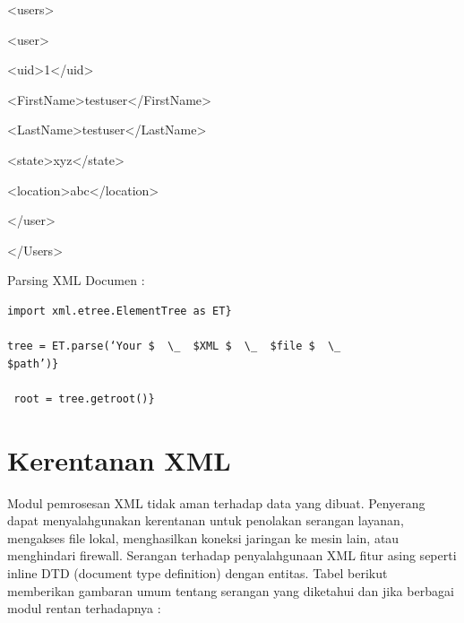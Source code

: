  {\fontsize{10pt}{10pt}\selectfont <users>} 
 
{\fontsize{10pt}{10pt}\selectfont  \hspace*{0.5in} <user>} 
 
{\fontsize{10pt}{10pt}\selectfont  \hspace*{0.5in}  \hspace*{0.5in} <uid>1</uid>} 
 
{\fontsize{10pt}{10pt}\selectfont  \hspace*{0.5in}  \hspace*{0.5in} <FirstName>testuser</FirstName>} 
 
{\fontsize{10pt}{10pt}\selectfont  \hspace*{0.5in}  \hspace*{0.5in} <LastName>testuser</LastName>} 
 
{\fontsize{10pt}{10pt}\selectfont  \hspace*{0.5in}  \hspace*{0.5in} <state>xyz</state>} 
 
{\fontsize{10pt}{10pt}\selectfont  \hspace*{0.5in}  \hspace*{0.5in} <location>abc</location>} 
 
{\fontsize{10pt}{10pt}\selectfont  \hspace*{0.5in} </user>} 
 
{\fontsize{10pt}{10pt}\selectfont </Users>} 
\vspace{10pt}
 
Parsing XML Documen : 
\begin{verbatim} 
import xml.etree.ElementTree as ET} 
 
tree = ET.parse(‘Your $  \_  $XML $  \_  $file $  \_  
$path’)} 
 
 root = tree.getroot()} 
\end{verbatim}

\section{Kerentanan XML}
\hspace*{0.5in} Modul pemrosesan XML tidak aman terhadap data yang dibuat. Penyerang dapat menyalahgunakan kerentanan untuk penolakan serangan layanan, mengakses file lokal, menghasilkan koneksi jaringan ke mesin lain, atau menghindari firewall. Serangan terhadap penyalahgunaan XML fitur asing seperti inline DTD (document type definition) dengan entitas. Tabel berikut memberikan gambaran umum tentang serangan yang diketahui dan jika berbagai modul rentan terhadapnya :


